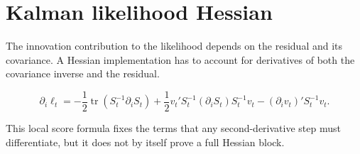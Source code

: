 \section{Kalman likelihood Hessian}
The innovation contribution to the likelihood depends on the residual and its covariance.
A Hessian implementation has to account for derivatives of both the covariance inverse and the residual.

\begin{equation}\label{eq:kalman-innovation-score-local}
\partial_i \ell_t
= -\frac{1}{2}\operatorname{tr}(S_t^{-1}\partial_i S_t)
+ \frac{1}{2}v_t' S_t^{-1}(\partial_i S_t)S_t^{-1}v_t
- (\partial_i v_t)'S_t^{-1}v_t.
\end{equation}

This local score formula fixes the terms that any second-derivative step must differentiate, but it does not by itself prove a full Hessian block.
